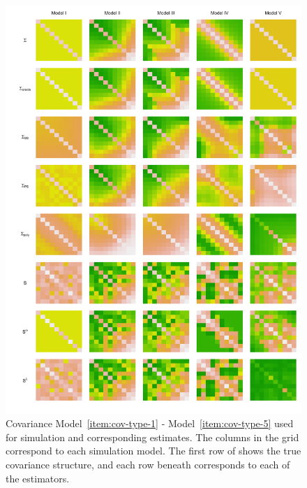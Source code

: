 \captionsetup[subfigure]{labelformat=empty}
\begin{figure}[H] \label{fig:cov-estimate-lattice}
\centering
\caption{Covariance Model~\ref{item:cov-type-1} - Model~\ref{item:cov-type-5} used for simulation and corresponding estimates. The columns in the grid correspond to each simulation model. The first row of shows the true covariance structure, and each row beneath corresponds to each of the estimators.}
  \includegraphics[width = 1\textwidth]{../img/chapter-4/cov-estimate-lattice}
\end{figure}